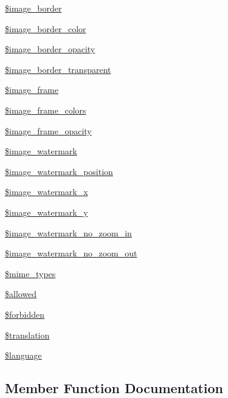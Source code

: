 \begin{DoxyCompactItemize}
\hyperlink{classupload_a1bf98cc551a8e4cf2dd857a8fc8a7848}{\$image\+\_\+border}
\item 
\hyperlink{classupload_a5b05de6835b8df322080220252596625}{\$image\+\_\+border\+\_\+color}
\item 
\hyperlink{classupload_a0ea3733d3d01a85b4b92ac29a1f55b3a}{\$image\+\_\+border\+\_\+opacity}
\item 
\hyperlink{classupload_a761cea56128baba2f06884c67e6bb3d9}{\$image\+\_\+border\+\_\+transparent}
\item 
\hyperlink{classupload_a17457e841d8ad97b17a362b6bf8dba3b}{\$image\+\_\+frame}
\item 
\hyperlink{classupload_a001d482305c1e19dac65e626acd85696}{\$image\+\_\+frame\+\_\+colors}
\item 
\hyperlink{classupload_a1b0a768e2b205bb98f7e0f287b635efa}{\$image\+\_\+frame\+\_\+opacity}
\item 
\hyperlink{classupload_a8711437a478aba88bcc3b8edd7953b13}{\$image\+\_\+watermark}
\item 
\hyperlink{classupload_a00d4612d9d07ceec0e3189c3f2dd99e0}{\$image\+\_\+watermark\+\_\+position}
\item 
\hyperlink{classupload_ad1c4660d97fde989fa26d183b7adf1d7}{\$image\+\_\+watermark\+\_\+x}
\item 
\hyperlink{classupload_a46ba63768e7f0218faf604127f6f9695}{\$image\+\_\+watermark\+\_\+y}
\item 
\hyperlink{classupload_a7839ef03bc6cd2f5f61cc99805681683}{\$image\+\_\+watermark\+\_\+no\+\_\+zoom\+\_\+in}
\item 
\hyperlink{classupload_aa8a86dfa957a98e3058cc35c6e252ae5}{\$image\+\_\+watermark\+\_\+no\+\_\+zoom\+\_\+out}
\item 
\hyperlink{classupload_a49932ececf6da03a6379ca46ca1604d4}{\$mime\+\_\+types}
\item 
\hyperlink{classupload_a052b4d90b67a3c1385af18f17e897eb5}{\$allowed}
\item 
\hyperlink{classupload_a1b40a6a93647c547e69c0435a8894ee2}{\$forbidden}
\item 
\hyperlink{classupload_a1f198d410fecc3871ebdd468d343a5e3}{\$translation}
\item 
\hyperlink{classupload_a83170d318260a5a2e2a79dccdd371b10}{\$language}
\end{DoxyCompactItemize}


\subsection{Member Function Documentation}
\hypertarget{classupload_a5cf49aee8a213633ce9ac1c8548e15ec}{}
